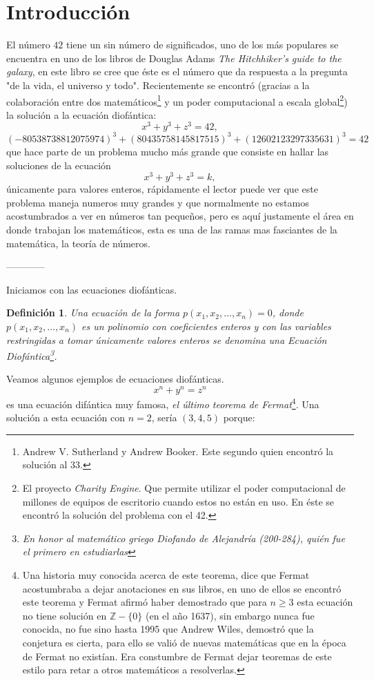 \documentclass{article}
\newtheorem{definition}{Definición}[]
\begin{document}
\section*{Introducción}
El número $42$ tiene un sin número de significados, uno de los más populares se encuentra en uno de los libros de Douglas Adams \textit{The Hitchhiker's guide to the galaxy}, en este libro se cree que éste es el número que da respuesta a la pregunta "de la vida, el universo y todo". Recientemente se encontró (gracias a la colaboración entre dos matemáticos\footnote{Andrew V. Sutherland y Andrew Booker. Este segundo quien encontró la solución al 33.} y un poder computacional a escala global\footnote{El proyecto \textit{Charity Engine}. Que permite utilizar el poder computacional de millones de equipos de escritorio cuando estos no están en uso. En éste se encontró la solución del problema con el 42.}) la solución a la ecuación diofántica:
$$x^3 + y^3 + z^3 = 42,$$
$$(-80538738812075974)^3 + (80435758145817515)^3 + (12602123297335631)^3 = 42$$
que hace parte de un problema mucho más grande que consiste en hallar las soluciones de la ecuación 
$$x^3 + y^3 + z^3 = k,$$
únicamente para valores enteros, rápidamente el lector puede ver que este problema maneja numeros muy grandes y que normalmente no estamos acostumbrados a ver en números tan pequeños, pero es aquí justamente el área en donde trabajan los matemáticos, esta es una de las ramas mas fasciantes de la matemática, la teoría de números.
\begin{center}
	------------
\end{center}
Iniciamos con las ecuaciones diofánticas.
\begin{definition}
	Una ecuación de la forma $p(x_1, x_2, \dots, x_n) = 0$, donde $p(x_1, x_2, \dots, x_n)$ es un polinomio con coeficientes enteros y con las variables restringidas a tomar únicamente valores enteros se denomina una \textit{Ecuación Diofántica}\footnote{En honor al matemático griego Diofando de Alejandría (200-284), quién fue el primero en estudiarlas}.
\end{definition}
Veamos algunos ejemplos de ecuaciones diofánticas.
$$x^n + y^n = z^n$$
es una ecuación difántica muy famosa, \textit{el último teorema de Fermat}\footnote{Una historia muy conocida acerca de este teorema, dice que Fermat acostumbraba a dejar anotaciones en sus libros, en uno de ellos se encontró este teorema y Fermat afirmó haber demostrado que para $n \geq 3$ esta ecuación no tiene solución en $\mathbb{Z} - \{0\}$ (en el año 1637), sin embargo nunca fue conocida, no fue sino hasta 1995 que Andrew Wiles, demostró que la conjetura es cierta, para ello se valió de nuevas matemáticas que en la época de Fermat no existían. Era constumbre de Fermat dejar teoremas de este estilo para retar a otros matemáticos a resolverlas.}. Una solución a esta ecuación con $n = 2$, sería $(3, 4, 5)$ porque:
\end{document}
